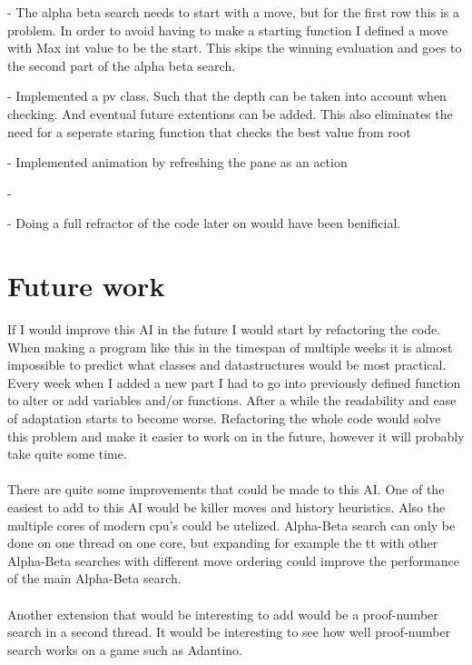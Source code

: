 \documentclass{article}
\begin{document}
- The alpha beta search needs to start with a move, but for the first row this is a problem. In order to avoid having to make a starting function I defined a move with Max int value to be the start. This skips the winning evaluation and goes to the second part of the alpha beta search.

- Implemented a pv class. Such that the depth can be taken into account when checking. And eventual future extentions can be added. This also eliminates the need for a seperate staring function that checks the best value from root

- Implemented animation by refreshing the pane as an action

- 

- Doing a full refractor of the code later on would have been benificial.

\fi

\section{Future work}
If I would improve this AI in the future I would start by refactoring the code. When making a program like this in the timespan of multiple weeks it is almost impossible to predict what classes and datastructures would be most practical. Every week when I added a new part I had to go into previously defined function to alter or add variables and/or functions. After a while the readability and ease of adaptation starts to become worse. Refactoring the whole code would solve this problem and make it easier to work on in the future, however it will probably take quite some time. %
\\
\\
There are quite some improvements that could be made to this AI. One of the easiest to add to this AI would be killer moves and history heuristics. Also the multiple cores of modern cpu's could be utelized. Alpha-Beta search can only be done on one thread on one core, but expanding for example the tt with other Alpha-Beta searches with different move ordering could improve the performance of the main Alpha-Beta search.
\\
\\
Another extension that would be interesting to add would be a proof-number search in a second thread. It would be interesting to see how well proof-number search works on a game such as Adantino.
\end{document}

